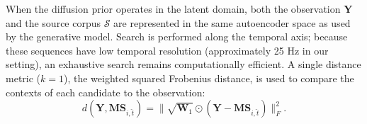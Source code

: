 \documentclass{article}
\begin{document}
When the diffusion prior operates in the latent domain, both the observation $\mathbf{Y}$ and the source corpus $\mathcal{S}$ are represented in the same autoencoder space as used by the generative model.
Search is performed along the temporal axis; because these sequences have low temporal resolution (approximately 25 Hz in our setting), an exhaustive search remains computationally efficient. 
A single distance metric ($k=1$), the weighted squared Frobenius distance, is used to compare the contexts of each candidate to the observation:
\begin{equation}
    d(\mathbf{Y},\mathbf{M} \mathbf{S}_{i,\hat{t}}) = \|\sqrt{\mathbf{W}_1} \odot (\mathbf{Y} - \mathbf{M} \mathbf{S}_{i,\hat{t}})\|_F^2.
\end{equation}
\end{document}
